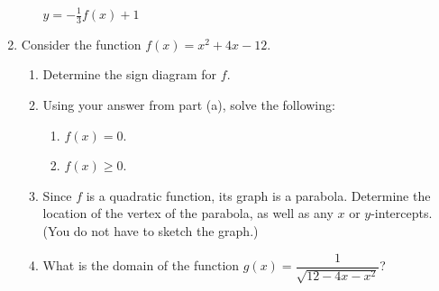 \documentclass[12pt]{article}
\newcommand{\points}[1]{\marginpar{\hspace{24pt}[#1]}}
\begin{document}
\begin{enumerate}
\begin{enumerate}
\begin{multicols}{2}
\begin{center}
$y=-\frac{1}{3}f(x)+1$
\end{center}
\end{multicols}

\end{enumerate}
\newpage

\item Consider the function $f(x) = x^2+4x-12$.
\begin{enumerate}
 \item Determine the sign diagram for $f$. \points{4}

\vspace{2in}

 \item Using your answer from part (a), solve the following:
\begin{enumerate}
 \item $f(x)=0$. \points{1}

\vspace{0.5in}

 \item $f(x)\geq 0$. \points{1}
\end{enumerate}

\vspace{0.75in}

\item Since $f$ is a quadratic function, its graph is a parabola. Determine the location of the vertex of the parabola, as well as any $x$ or $y$-intercepts. (You do not have to sketch the graph.) \points{3}

\vspace{2in}

\item What is the domain of the function $g(x) = \dfrac{1}{\sqrt{12-4x-x^2}}$? \points{1}



\end{enumerate}


\end{enumerate}
\end{document}
